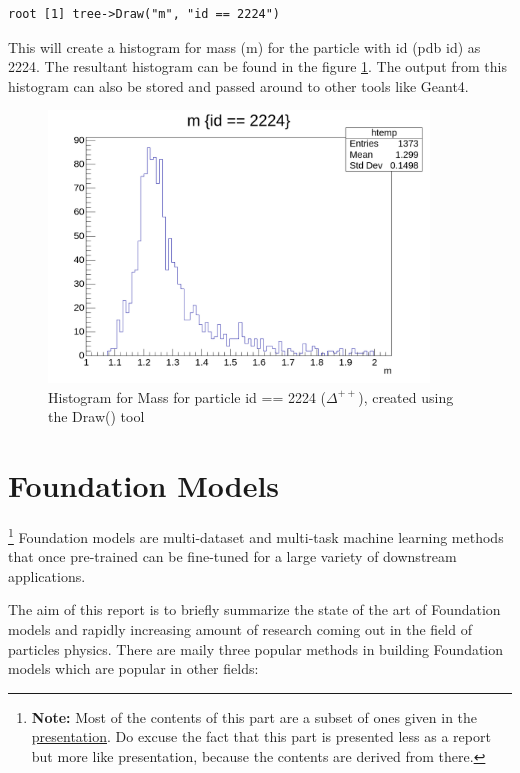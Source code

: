 \documentclass[letterpaper,12pt]{article}
\begin{document}
\begin{spacing}{1.125}
\begin{lstlisting}[style=python]
root [1] tree->Draw("m", "id == 2224")
\end{lstlisting}

This will create a histogram for mass (m) for the particle with id (pdb id) as
2224. The resultant histogram can be found in the figure \ref{m-hist}.
The
output from this histogram can also be stored and passed around to other tools
like Geant4.

\clearpage

\begin{figure}[!htb]
  \includegraphics[width=0.9\textwidth]{m-hist.png}
  \caption{Histogram for Mass for particle id == 2224 ($\Delta^{++}$), created
  using the Draw() tool}
  \label{m-hist}
\end{figure}


\pagebreak
\section{Foundation Models}

\footnote{\textbf{Note:} Most of the contents of this part are a subset of ones given in the
\href{https://github.com/abhiramtilakiiit/research/blob/main/presentations/fm.pdf}{presentation}.
Do excuse the fact that this part is presented less as a report but more like presentation, because the
contents are derived from there.
}
Foundation models are multi-dataset and multi-task machine
learning methods that once pre-trained can be fine-tuned for a
large variety of downstream applications.

The aim of this report is to briefly summarize the state of the art of
Foundation models and rapidly increasing amount of research coming out in
the field of particles physics.
There are maily three popular methods in building Foundation models which are popular
in other fields:


\end{spacing}
\end{document}
